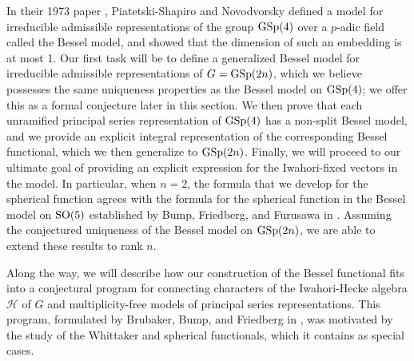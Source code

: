 \documentclass[11pt,letterpaper]{article}
\newcommand{\calH}{\mathcal{H}} %
\newcommand{\SO}{\textup{SO}}
\newcommand{\GSp}{\textup{GSp}}
\theoremstyle{remark}
\numberwithin{equation}{section}
\begin{document}
In their 1973 paper \cite{NPS}, Piatetski-Shapiro and Novodvorsky defined a model for irreducible admissible representations of the group $\GSp(4)$ over a $p$-adic field called the Bessel model, and showed that the dimension of such an embedding is at most 1. Our first task will be to define a generalized Bessel model for irreducible admissible representations of $G = \GSp(2n)$, which we believe possesses the same uniqueness properties as the Bessel model on $\GSp(4)$; we offer this as a formal conjecture later in this section. We then prove that each unramified principal series representation of $\GSp(4)$ has a non-split Bessel model, and we provide an explicit integral representation of the corresponding Bessel functional, which we then generalize to $\GSp(2n)$. Finally, we will proceed to our ultimate goal of providing an explicit expression for the Iwahori-fixed vectors in the model. In particular, when $n=2$, the formula that we develop for the spherical function agrees with the formula for the spherical function in the Bessel model on $\SO(5)$ established by Bump, Friedberg, and Furusawa in \cite{BFF}. Assuming the conjectured uniqueness of the Bessel model on $\GSp(2n)$, we are able to extend these results to rank $n$.



Along the way, we will describe how our construction of the Bessel functional fits into a conjectural program for connecting characters of the Iwahori-Hecke algebra $\calH$ of $G$ and multiplicity-free models of principal series representations. This program, formulated by Brubaker, Bump, and Friedberg in \cite{BBF2}, was motivated by the study of the Whittaker and spherical functionals, which it contains as special cases.
\end{document}
